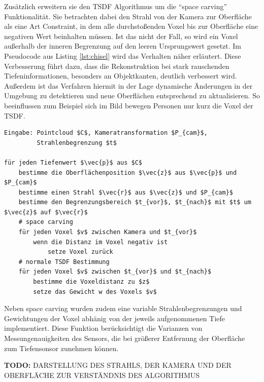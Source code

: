 Zusätzlich erweitern sie den TSDF Algorithmus um die \enquote{space carving} Funktionalität. Sie betrachten dabei den Strahl von der Kamera zur Oberfläche als eine Art Constraint, in dem alle durchstoßenden Voxel bis zur Oberfläche eine negativen Wert beinhalten müssen. Ist das nicht der Fall, so wird ein Voxel außerhalb der inneren Begrenzung auf den leeren Ursprungswert gesetzt. Im Pseudocode aus Listing \ref{lst:chisel} wird das Verhalten näher erläutert. Diese Verbesserung führt dazu, dass die Rekonstruktion bei stark rauschenden Tiefeninformationen, besonders an Objektkanten, deutlich verbessert wird. Außerdem ist das Verfahren hiermit in der Lage dynamische Änderungen in der Umgebung zu detektieren und neue Oberflächen entsprechend zu aktualisieren. So beeinflussen zum Beispiel sich im Bild bewegen Personen nur kurz die Voxel der TSDF. \citep{Klingensmith_2015_7924}\\

\begin{lstlisting}[mathescape,caption=Chisel TSDF Algorithmus, label=lst:chisel]
Eingabe: Pointcloud $C$, Kameratransformation $P_{cam}$, 
         Strahlenbegrenzung $t$

für jeden Tiefenwert $\vec{p}$ aus $C$
    bestimme die Oberflächenposition $\vec{z}$ aus $\vec{p}$ und $P_{cam}$
    bestimme einen Strahl $\vec{r}$ aus $\vec{z}$ und $P_{cam}$
    bestimme den Begrenzungsbereich $t_{vor}$, $t_{nach}$ mit $t$ um $\vec{z}$ auf $\vec{r}$
    # space carving
    für jeden Voxel $v$ zwischen Kamera und $t_{vor}$
        wenn die Distanz im Voxel negativ ist
            setze Voxel zurück
    # normale TSDF Bestimmung
    für jeden Voxel $v$ zwischen $t_{vor}$ und $t_{nach}$
        bestimme die Voxeldistanz zu $z$
        setze das Gewicht w des Voxels $v$
\end{lstlisting}

Neben space carving wurden zudem eine variable Strahlenbegrenzungen und Gewichtungen der Voxel abhänig von der jeweils aufgenommenen Tiefe implementiert. Diese Funktion berücksichtigt die Varianzen von Messungenauigkeiten des Sensors, die bei größerer Entfernung der Oberfläche zum Tiefensonsor zunehmen können. \citep{Klingensmith_2015_7924}

\textbf{TODO:} DARSTELLUNG DES STRAHLS, DER KAMERA UND DER OBERFLÄCHE ZUR VERSTÄNDNIS DES ALGORITHMUS